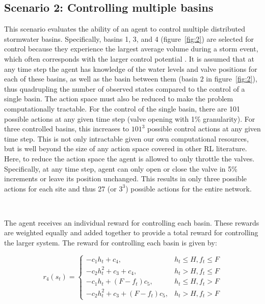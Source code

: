 \subsection{Scenario 2: Controlling multiple basins}

This scenario evaluates the ability of an agent to control multiple distributed stormwater basins.
Specifically, basins 1, 3, and 4 (figure~\ref{fig:2}) are selected for control because they experience the largest average volume during a storm event, which often corresponds with the larger control potential \cite{schutze_sewer_2008}.
It is assumed that at any time step the agent has knowledge of the water levels and valve positions for each of these basins, as well as the basin between them (basin $2$ in figure~\ref{fig:2}), thus quadrupling the number of observed states compared to the control of a single basin.
The action space must also be reduced to make the problem computationally tractable.
For the control of the single basin, there are 101 possible actions at any given time step (valve opening with 1\% granularity).
For three controlled basins, this increases to $101^3$ possible control actions at any given time step. This is not only intractable given our own computational resources, but is well beyond the size of any action space covered in other RL literature.
Here, to reduce the action space the agent is allowed to only throttle the valves. Specifically, at any time step, agent can only open or close the valve in 5\% increments or leave its position unchanged.
This results in only three possible actions for each site and thus 27 (or $3^3$) possible actions for the entire network.

\

The agent receives an individual reward for controlling each basin. These rewards are weighted equally and added together to provide a total reward for controlling the larger system. The reward for controlling each basin is given by:


\begin{equation}
	r_4 (s_t) = \begin{cases}
		-c_1 h_t+c_4, & h_t \leq H, f_t \leq F \\
		-c_2 h_t^2+c_3+c_4, & h_t > H, f_t \leq F\\
		-c_1 h_t+(F-f_t)c_5, & h_t \leq H ,f_t > F\\
		-c_2 h_t^2+c_3+(F-f_t ) c_5, &  h_t>H ,f_t>F
	\end{cases}
\end{equation}

